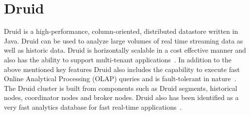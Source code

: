\section{Druid}

Druid is a high-performance, column-oriented, distributed datastore
written in Java. Druid can be used to analyze large volumes of real
time streaming data as well as historic data. Druid is horizontally
scalable in a cost effective manner and also has the ability to
support multi-tenant applications~\cite{hid-sp18-416-www-druid-wikipedia}. In addition to the above
mentioned key features Druid also includes the capability to execute
fast Online Analytical Processing (OLAP) queries and is fault-tolerant
in nature~\cite{hid-sp18-416-www-about-druid}. The Druid cluster is
built from components such as Druid segments, historical nodes,
coordinator nodes and broker nodes.  Druid also has been identified as
a very fast analytics database for fast real-time
applications~\cite{hid-sp18-416-www-fast-dataanalytics-druid-blog}.
